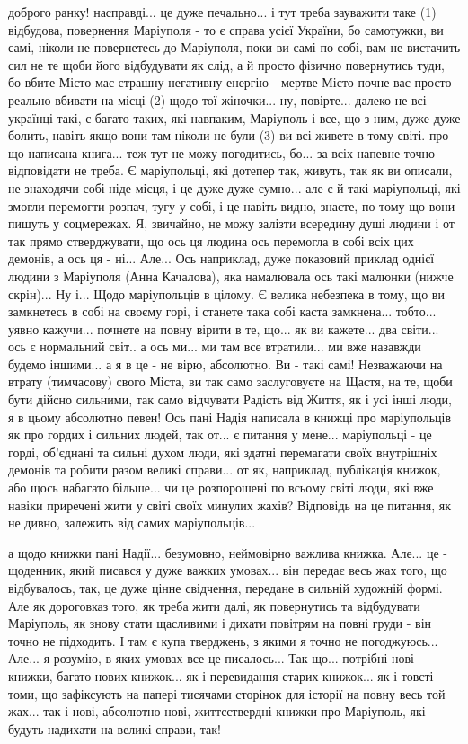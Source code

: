 доброго ранку! насправді... це дуже печально... і тут треба зауважити таке (1)
відбудова, повернення Маріуполя - то є справа усієї України, бо самотужки, ви
самі, ніколи не повернетесь до Маріуполя, поки ви самі по собі, вам не
вистачить сил не те щоби його відбудувати як слід, а й просто фізично
повернутись туди, бо вбите Місто має страшну негативну енергію - мертве Місто
почне вас просто реально вбивати на місці (2) щодо тої жіночки... ну,
повірте... далеко не всі українці такі, є багато таких, які навпаким, Маріуполь
і все, що з ним, дуже-дуже болить, навіть якщо вони там ніколи не були (3) ви
всі живете в тому світі. про що написана книга... теж тут не можу погодитись,
бо... за всіх напевне точно відповідати не треба. Є маріупольці, які дотепер
так, живуть, так як ви описали, не знаходячи собі ніде місця, і це дуже дуже
сумно... але є й такі маріупольці, які змогли перемогти розпач, тугу у собі, і
це навіть видно, знаєте, по тому що вони пишуть у соцмережах. Я, звичайно, не
можу залізти всередину душі людини і от так прямо стверджувати, що ось ця
людина ось перемогла в собі всіх цих демонів, а ось ця - ні... Але... Ось
наприклад, дуже показовий приклад однієї людини з Маріуполя (Анна Качалова),
яка намалювала ось такі малюнки (нижче скрін)... Ну і... Щодо маріупольців в
цілому. Є велика небезпека в тому, що ви замкнетесь в собі на своєму горі, і
станете така собі каста замкнена... тобто... уявно кажучи... почнете на повну
вірити в те, що... як ви кажете... два світи... ось є нормальний світ.. а ось
ми... ми там все втратили... ми вже назавжди будемо іншими... а я в це - не
вірю, абсолютно. Ви - такі самі! Незважаючи на втрату (тимчасову) свого Міста,
ви так само заслуговуєте на Щастя, на те, щоби бути дійсно сильними, так само
відчувати Радість від Життя, як і усі інші люди, я в цьому абсолютно певен! Ось
пані Надія написала в книжці про маріупольців як про гордих і сильних людей,
так от... є питання у мене... маріупольці - це горді, об'єднані та сильні духом
люди, які здатні перемагати своїх внутрішніх демонів та робити разом великі
справи... от як, наприклад, публікація книжок, або щось набагато більше... чи
це розпорошені по всьому світі люди, які вже навіки приречені жити у світі
своїх минулих жахів? Відповідь на це питання, як не дивно, залежить від самих
маріупольців...

а щодо книжки пані Надії... безумовно, неймовірно важлива книжка. Але... це -
щоденник, який писався у дуже важких умовах... він передає весь жах того, що
відбувалось, так, це дуже цінне свідчення, передане в сильній художній формі.
Але як дороговказ того, як треба жити далі, як повернутись та відбудувати
Маріуполь, як знову стати щасливими і дихати повітрям на повні груди - він
точно не підходить. І там є купа тверджень, з якими я точно не погоджуюсь...
Але... я розумію, в яких умовах все це писалось... Так що... потрібні нові
книжки, багато нових книжок... як і перевидання старих книжок... як і товсті
томи, що зафіксують на папері тисячами сторінок для історії на повну весь той
жах... так і нові, абсолютно нові, життєствердні книжки про Маріуполь, які
будуть надихати на великі справи, так!

